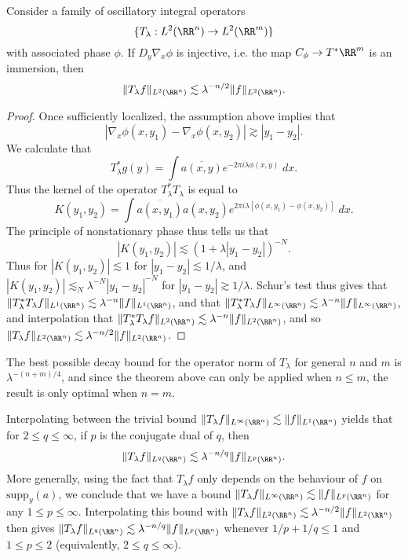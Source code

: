 \begin{theorem} Consider a family of oscillatory integral operators
%
\[ \{ T_\lambda: L^2(\RR^n) \to L^2(\RR^m) \} \]
%
with associated phase $\phi$. If $D_y \nabla_x \phi$ is injective, i.e. the map $C_\phi \to T^* \RR^m$ is an immersion, then
%
\[ \| T_\lambda f \|_{L^2(\RR^n)} \lesssim \lambda^{-n/2} \| f \|_{L^2(\RR^n)}. \]
\end{theorem}
\begin{proof}
    Once sufficiently localized, the assumption above implies that
    \[ |\nabla_x \phi(x,y_1) - \nabla_x \phi(x,y_2)| \gtrsim |y_1 - y_2|. \]
    We calculate that
    \[ T_\lambda^* g(y) = \int \overline{a(x,y)} e^{- 2 \pi i \lambda \phi(x,y)}\; dx. \]
    Thus the kernel of the operator $T_\lambda^* T_\lambda$ is equal to
    \[ K(y_1,y_2) = \int \overline{a(x,y_1)} a(x,y_2) e^{2 \pi i \lambda [\phi(x,y_1) - \phi(x,y_2)]}\; dx. \]
    The principle of nonstationary phase thus tells us that
    \[ |K(y_1,y_2)| \lesssim (1 + \lambda |y_1 - y_2|)^{-N}. \]
    Thus for $|K(y_1,y_2)| \lesssim 1$ for $|y_1 - y_2| \lesssim 1/\lambda$, and $|K(y_1,y_2)| \lesssim_N \lambda^{-N} |y_1 - y_2|^{-N}$ for $|y_1 - y_2| \gtrsim 1/\lambda$. Schur's test thus gives that $\| T_\lambda^* T_\lambda f \|_{L^1(\RR^n)} \lesssim \lambda^{-n} \| f \|_{L^1(\RR^n)}$, and that $\| T_\lambda^* T_\lambda f \|_{L^\infty(\RR^n)} \lesssim \lambda^{-n} \| f \|_{L^\infty(\RR^n)}$, and interpolation that $\| T_\lambda^* T_\lambda f \|_{L^2(\RR^n)} \lesssim \lambda^{-n} \| f \|_{L^2(\RR^n)}$, and so $\| T_\lambda f \|_{L^2(\RR^n)} \lesssim \lambda^{-n/2} \| f \|_{L^2(\RR^n)}$.
\end{proof}

\begin{remark}
    The best possible decay bound for the operator norm of $T_\lambda$ for general $n$ and $m$ is $\lambda^{-(n+m)/4}$, and since the theorem above can only be applied when $n \leq m$, the result is only optimal when $n = m$.
\end{remark}

Interpolating between the trivial bound $\| T_\lambda f \|_{L^\infty(\RR^n)} \lesssim \| f \|_{L^1(\RR^n)}$ yields that for $2 \leq q \leq \infty$, if $p$ is the conjugate dual of $q$, then
%
\[ \| T_\lambda f \|_{L^q(\RR^n)} \lesssim \lambda^{-n/q} \| f \|_{L^p(\RR^n)}. \]
%
More generally, using the fact that $T_\lambda f$ only depends on the behaviour of $f$ on $\text{supp}_y(a)$, we conclude that we have a bound $\| T_\lambda f \|_{L^\infty(\RR^n)} \lesssim \| f \|_{L^p(\RR^n)}$ for any $1 \leq p \leq \infty$. Interpolating this bound with $\| T_\lambda f \|_{L^2(\RR^n)} \lesssim \lambda^{-n/2} \| f \|_{L^2(\RR^n)}$ then gives $\| T_\lambda f \|_{L^q(\RR^n)} \lesssim \lambda^{-n/q} \| f \|_{L^p(\RR^n)}$ whenever $1/p + 1/q \leq 1$ and $1 \leq p \leq 2$ (equivalently, $2 \leq q \leq \infty$).

